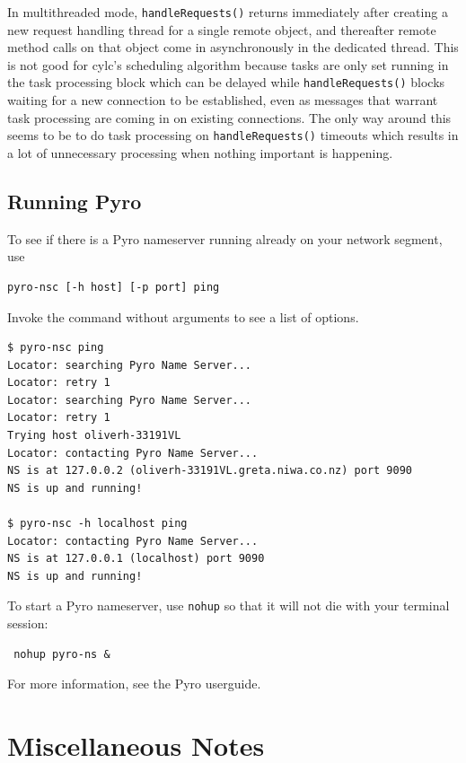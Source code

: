\documentclass[11pt,a4paper]{article}
\begin{document}
In multithreaded mode, \lstinline=handleRequests()= returns immediately
after creating a new request handling thread for a single remote object,
and thereafter remote method calls on that object come in asynchronously
in the dedicated thread. This is not good for cylc's scheduling
algorithm because tasks are only set running in the task processing
block which can be delayed while \lstinline=handleRequests()= blocks waiting
for a new connection to be established, even as messages that warrant
task processing are coming in on existing connections. The only way
around this seems to be to do task processing on \lstinline=handleRequests()=
timeouts which results in a lot of unnecessary processing when nothing
important is happening.

\subsection{Running Pyro}
\label{RunningPyro}

To see if there is a Pyro nameserver running already on your network
segment, use 
\begin{lstlisting}
pyro-nsc [-h host] [-p port] ping
\end{lstlisting}
Invoke the command without arguments to see a list of options.

\lstset{language=bash}

\begin{lstlisting}
$ pyro-nsc ping
Locator: searching Pyro Name Server...
Locator: retry 1
Locator: searching Pyro Name Server...
Locator: retry 1
Trying host oliverh-33191VL
Locator: contacting Pyro Name Server...
NS is at 127.0.0.2 (oliverh-33191VL.greta.niwa.co.nz) port 9090
NS is up and running!

$ pyro-nsc -h localhost ping
Locator: contacting Pyro Name Server...
NS is at 127.0.0.1 (localhost) port 9090
NS is up and running!
\end{lstlisting}

To start a Pyro nameserver, use \lstinline{nohup} so that it
will not die with your terminal session: 

\begin{lstlisting}
 nohup pyro-ns &
\end{lstlisting}

For more information, see the Pyro userguide.

\pagebreak
\section{Miscellaneous Notes}
\label{MiscellaneousNotes}
\end{document}
